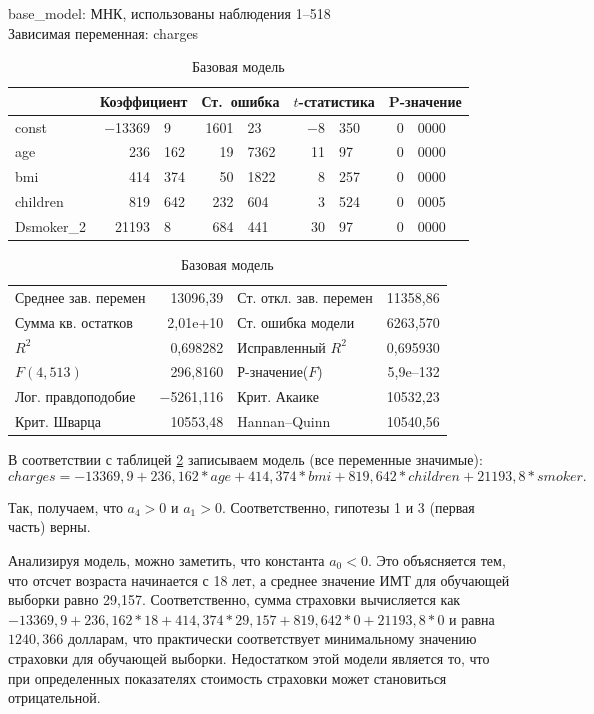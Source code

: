 \documentclass[a4paper,12pt]{article}
\begin{document}
\begin{table}[H]
\begin{center}
	base\_model:
	МНК, использованы наблюдения 1--518\\
	Зависимая переменная: charges\\
	\vspace{1em}	
	\begin{tabular}{|l|r@{,}l|r@{,}l|r@{,}l|r@{,}l|}
		\hline
		&
		\multicolumn{2}{c|}{Коэффициент} &
		\multicolumn{2}{c|}{Ст.\ ошибка} &
		\multicolumn{2}{c|}{$t$-статистика} &
		\multicolumn{2}{c|}{P-значение} \\[1ex]
		\hline
		const & $-$13369&9 & 1601&23 & $-$8&350 & 0&0000 \\
		\hline
		age & 236&162 &	19&7362 & 11&97 & 0&0000 \\
		\hline
		bmi & 414&374 &	50&1822 & 8&257 & 0&0000 \\
		\hline
		children & 819&642 & 232&604 & 3&524 & 0&0005 \\
		\hline
		Dsmoker\_2 & 21193&8 & 684&441 & 30&97 & 0&0000 \\
		\hline
	\end{tabular}	
	\vspace{1ex}
	\begin{tabular}{lrlr}
		Среднее зав. перемен &  13096,39 & Ст. откл. зав. перемен &  11358,86 \\
		Сумма кв. остатков &  2,01\textrm{e+10} & Ст. ошибка модели &  6263,570 \\
		$R^2$ &  0,698282 & Исправленный $R^2$ &  0,695930 \\
		$F(4, 513)$ &  296,8160 & Р-значение($F$) &  5,9\textrm{e--132} \\
		Лог. правдоподобие & $-$5261,116 & Крит. Акаике &  10532,23 \\
		Крит. Шварца &  10553,48 & Hannan--Quinn &  10540,56 \\
	\end{tabular}
\caption{Базовая модель}
\label{tab:base}	
\end{center}
\end{table}

В соответствии с таблицей \ref{tab:base} записываем модель (все переменные значимые):
\[charges = -13369,9 + 236,162 * age + 414,374 * bmi + 819,642 * children + 21193,8 * smoker.\]

Так, получаем, что $a_4 > 0$ и $a_1 > 0$. Соответственно, гипотезы 1 и 3 (первая часть) верны.

Анализируя модель, можно заметить, что константа $a_0 < 0$. Это объясняется тем, что отсчет возраста начинается с 18 лет, а среднее значение ИМТ для обучающей выборки равно 29,157. Соответственно, сумма страховки вычисляется как $-13369,9 + 236,162 * 18 + 414,374 * 29,157 + 819,642 * 0 + 21193,8 * 0$ и равна $1240,366$ долларам, что практически соответствует минимальному значению страховки для обучающей выборки. Недостатком этой модели является то, что при определенных показателях стоимость страховки может становиться отрицательной.
\end{document}
